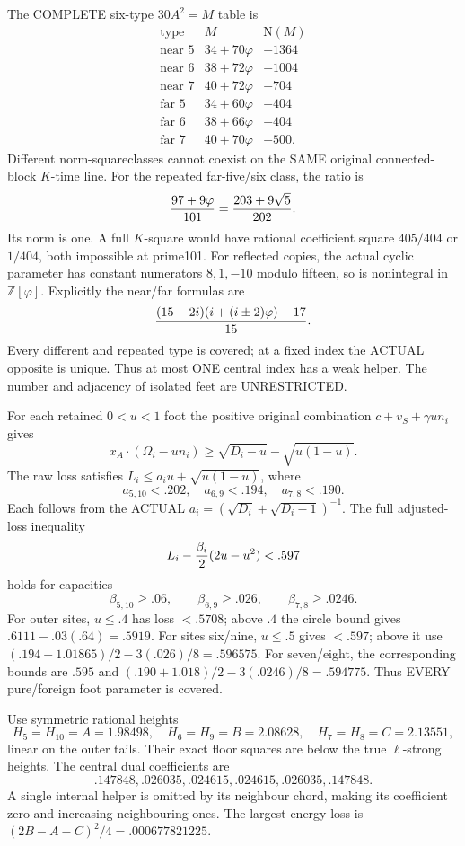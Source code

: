 The COMPLETE six-type \(30A^2=M\) table is
\[
\begin{array}{c|c|r}
 \text{type}&M&\mathrm N(M)\\ \hline
 \text{near }5&34+70\varphi&-1364\\
 \text{near }6&38+72\varphi&-1004\\
 \text{near }7&40+72\varphi&-704\\
 \text{far }5&34+60\varphi&-404\\
 \text{far }6&38+66\varphi&-404\\
 \text{far }7&40+70\varphi&-500 .
\end{array}
\]
Different norm-squareclasses cannot coexist on
the SAME original connected-block \(K\)-time line.
For the repeated far-five/six class, the ratio is
\[
                         {97+9\varphi\over101}
                              ={203+9\sqrt5\over202}.
\]
Its norm is one.
A full \(K\)-square would have rational
coefficient square \(405/404\) or \(1/404\),
both impossible at prime101.
For reflected copies, the actual cyclic parameter
has constant numerators \(8,1,-10\) modulo fifteen,
so is nonintegral in \(\mathbb Z[\varphi]\).
Explicitly the near/far formulas are
\[
 { (15-2i)(i+(i\pm2)\varphi)-17\over15}.
\]
Every different and repeated type is covered;
at a fixed index the ACTUAL opposite is unique.
Thus at most ONE central index has a weak helper.
The number and adjacency of isolated feet are
UNRESTRICTED.

For each retained \(0<u<1\) foot the positive
original combination
\(c+v_S+\gamma u n_i\) gives
\[
 x_A\cdot(\Omega_i-un_i)\ge
                    \sqrt{D_i-u}-\sqrt{u(1-u)} .
\]
The raw loss satisfies
\(L_i\le a_i u+\sqrt{u(1-u)}\), where
\[
 a_{5,10}<.202,\quad a_{6,9}<.194,\quad
 a_{7,8}<.190 .
\]
Each follows from the ACTUAL
\(a_i=(\sqrt{D_i}+\sqrt{D_i-1})^{-1}\).
The full adjusted-loss inequality
\[
                 L_i-{\beta_i\over2}(2u-u^2)<.597
\]
holds for capacities
\[
 \beta_{5,10}\ge.06,\qquad
 \beta_{6,9}\ge.026,\qquad
 \beta_{7,8}\ge.0246 .
\]
For outer sites, \(u\le.4\) has loss \(<.5708\);
above \(.4\) the circle bound gives
\(.6111-.03(.64)=.5919\).
For sites six/nine, \(u\le.5\) gives \(<.597\);
above it use
\((.194+1.01865)/2-3(.026)/8=.596575\).
For seven/eight, the corresponding bounds are
\(.595\) and
\((.190+1.018)/2-3(.0246)/8=.594775\).
Thus EVERY pure/foreign foot parameter is covered.

Use symmetric rational heights
\[
 H_5=H_{10}=A=1.98498,\quad
 H_6=H_9=B=2.08628,\quad
 H_7=H_8=C=2.13551,
\]
linear on the outer tails.
Their exact floor squares are below the true
\(\ell\)-strong heights.
The central dual coefficients are
\[
                  .147848,.026035,.024615,
                  .024615,.026035,.147848 .
\]
A single internal helper is omitted by its
neighbour chord, making its coefficient zero
and increasing neighbouring ones.
The largest energy loss is
\((2B-A-C)^2/4=.000677821225\).


